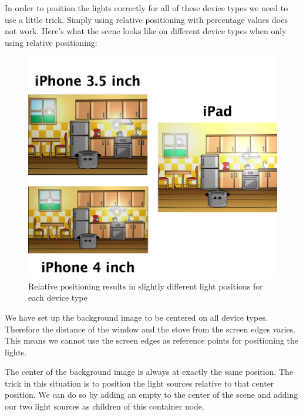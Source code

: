 In order to position the lights correctly for all of these device types we need
to use a little trick. Simply using relative positioning with percentage values
does not work. Here's what the scene looks like on different device types
when only using relative positioning: 
\begin{figure}[H]
    \centering
    \includegraphics[width=0.8\linewidth]{images/Chapter9/light_source_relative_position.png}
    \caption{Relative positioning results in slightly different light positions
    for each device type}
\end{figure}

We have set up the background image to be centered on all device types.
Therefore the distance of the window and the stove from the screen edges varies.
This means we cannot use the screen edges as reference points for positioning
the lights.

The center of the background image is always at exactly the same position. The
trick in this situation is to position the light sources relative to that center
position. We can do so by adding an empty \ccnode{} to the center of the scene
and adding our two light sources as children of this container node.

